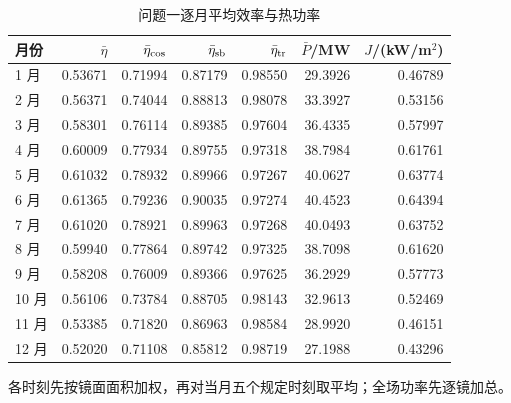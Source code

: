 \begin{table}[H]\centering\small
\caption{问题一逐月平均效率与热功率}\label{tab:q1_monthly}
\begin{tabular}{lrrrrrr}\toprule
月份 & $\bar\eta$ & $\bar\eta_{\rm cos}$ & $\bar\eta_{\rm sb}$ & $\bar\eta_{\rm tr}$ & $\bar P$/MW & $J$/(kW/m$^2$)\\\midrule
1 月 & 0.53671 & 0.71994 & 0.87179 & 0.98550 & 29.3926 & 0.46789\\
2 月 & 0.56371 & 0.74044 & 0.88813 & 0.98078 & 33.3927 & 0.53156\\
3 月 & 0.58301 & 0.76114 & 0.89385 & 0.97604 & 36.4335 & 0.57997\\
4 月 & 0.60009 & 0.77934 & 0.89755 & 0.97318 & 38.7984 & 0.61761\\
5 月 & 0.61032 & 0.78932 & 0.89966 & 0.97267 & 40.0627 & 0.63774\\
6 月 & 0.61365 & 0.79236 & 0.90035 & 0.97274 & 40.4523 & 0.64394\\
7 月 & 0.61020 & 0.78921 & 0.89963 & 0.97268 & 40.0493 & 0.63752\\
8 月 & 0.59940 & 0.77864 & 0.89742 & 0.97325 & 38.7098 & 0.61620\\
9 月 & 0.58208 & 0.76009 & 0.89366 & 0.97625 & 36.2929 & 0.57773\\
10 月 & 0.56106 & 0.73784 & 0.88705 & 0.98143 & 32.9613 & 0.52469\\
11 月 & 0.53385 & 0.71820 & 0.86963 & 0.98584 & 28.9920 & 0.46151\\
12 月 & 0.52020 & 0.71108 & 0.85812 & 0.98719 & 27.1988 & 0.43296\\
\bottomrule\end{tabular}
\par\smallskip\begin{minipage}{.94\linewidth}\footnotesize 各时刻先按镜面面积加权，再对当月五个规定时刻取平均；全场功率先逐镜加总。\end{minipage}
\end{table}
